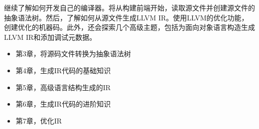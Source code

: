 继续了解如何开发自己的编译器。将从构建前端开始，读取源文件并创建源文件的抽象语法树。然后，了解如何从源文件生成LLVM IR。使用LLVM的优化功能，创建优化的机器码。此外，还会探索几个高级主题，包括为面向对象语言构造生成LLVM IR和添加调试元数据。

\begin{itemize}
\item
第3章，将源码文件转换为抽象语法树

\item
第4章，生成IR代码的基础知识

\item
第5章，高级语言结构生成的IR

\item
第6章，生成IR代码的进阶知识

\item
第7章，优化IR
\end{itemize}